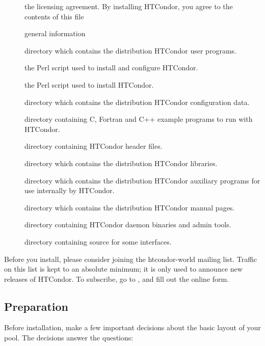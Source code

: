 \begin{description}
\item[] the licensing agreement.
                  By installing HTCondor, you agree to the contents of
		  this file
\item[] general information
\item[] directory which contains the distribution HTCondor
		  user programs.
\item[] the Perl script used to install and
                  configure HTCondor.
\item[] the Perl script used to install HTCondor.
\item[] directory which contains the distribution HTCondor
		  configuration data.
\item[] directory containing C, Fortran and C++ example
		  programs to run with HTCondor.
\item[] directory containing HTCondor header files.
\item[] directory which contains the distribution HTCondor
		  libraries.
\item[] directory which contains the distribution HTCondor
		  auxiliary programs for use internally by HTCondor.
\item[] directory which contains the distribution HTCondor
		  manual pages.
\item[] directory containing HTCondor daemon binaries and admin
		  tools.
\item[] directory containing source for some interfaces.
\end{description}

Before you install, please consider joining the htcondor-world mailing
list.
Traffic on this list is kept to an absolute minimum;
it is only used to announce new releases of HTCondor.
To subscribe, go to
,
and fill out the online form.
\subsection{\label{sec:Preparing-to-Install}Preparation} 

Before installation, make a few important
decisions about the basic layout of your pool.
The decisions answer the questions:

